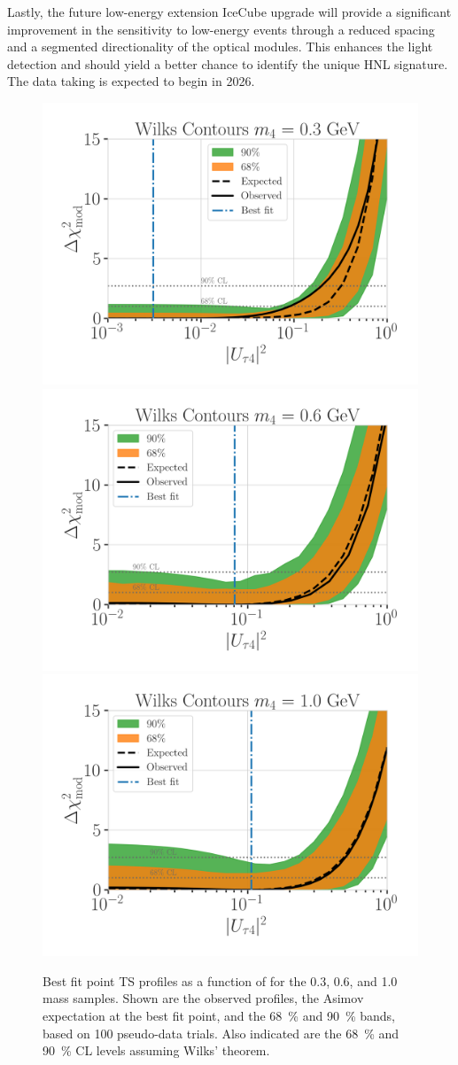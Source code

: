 Lastly, the future low-energy extension IceCube upgrade will provide a significant improvement in the sensitivity to low-energy events through a reduced spacing and a segmented directionality of the optical modules. This enhances the light detection and should yield a better chance to identify the unique HNL signature. The data taking is expected to begin in 2026.

\begin{figure}[h]
    \includegraphics[width=0.59\linewidth]{figures/results/best_fit/brazil_band_with_asimov_0.3_GeV_updated_with_bfp_with_1sigma.png}
    \includegraphics[width=0.59\linewidth]{figures/results/best_fit/brazil_band_with_asimov_0.6_GeV_updated_with_bfp_with_1sigma.png}
    \includegraphics[width=0.59\linewidth]{figures/results/best_fit/brazil_band_with_asimov_1.0_GeV_updated_with_bfp_with_1sigma.png}
	\caption[Best fit point TS profiles]{Best fit point TS profiles as a function of  for the \SI{0.3}{\gev}, \SI{0.6}{\gev}, and \SI{1.0}{\gev} mass samples. Shown are the observed profiles, the Asimov expectation at the best fit point, and the \SI{68}{\percent} and \SI{90}{\percent} bands, based on 100 pseudo-data trials. Also indicated are the \SI{68}{\percent} and \SI{90}{\percent} CL levels assuming Wilks' theorem.}
\end{figure}

